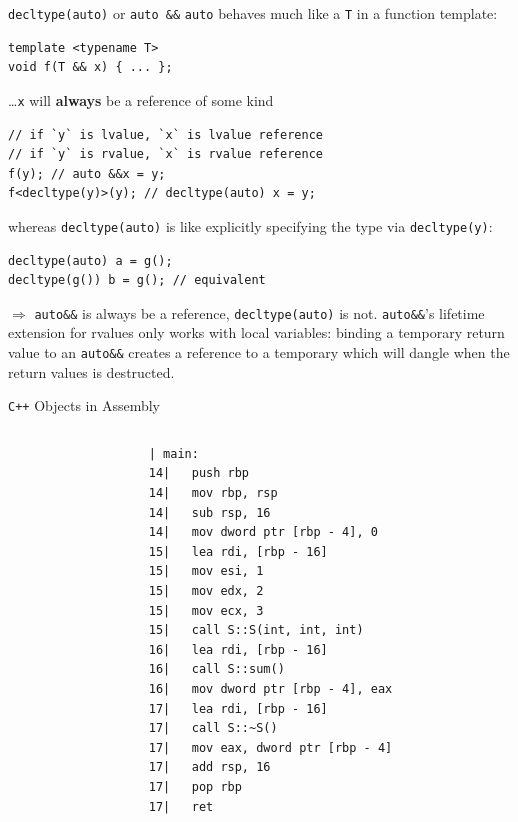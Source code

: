\documentclass[compress,aspectratio=1610]{beamer}
\newcommand{\inputcpplisting}[1]{}
\begin{document}
\begin{frame}[fragile]{\texttt{decltype(auto)} or \texttt{auto \&\&}}
    \texttt{auto} behaves much like a \texttt{T} in a function template:
    \begin{lstlisting}
template <typename T>
void f(T && x) { ... };
    \end{lstlisting}
    \ldots \texttt{x} will \textbf{always} be a reference of some kind
    \begin{lstlisting}
// if `y` is lvalue, `x` is lvalue reference
// if `y` is rvalue, `x` is rvalue reference
f(y); // auto &&x = y;
f<decltype(y)>(y); // decltype(auto) x = y;
    \end{lstlisting}
    whereas \texttt{decltype(auto)} is like explicitly specifying the type via \texttt{decltype(y)}:
    \begin{lstlisting}
decltype(auto) a = g();
decltype(g()) b = g(); // equivalent
    \end{lstlisting}

    $\Rightarrow$ \texttt{auto\&\&} is always be a reference, \texttt{decltype(auto)} is not. \texttt{auto\&\&}'s lifetime extension for rvalues only works with local variables: binding a temporary return value to an \texttt{auto\&\&} creates a reference to a temporary which will dangle when the return values is destructed. 
\end{frame}

\begin{frame}[fragile]{\texttt{C++} Objects in Assembly}
    \begin{columns}[t]
        \begin{column}{.45\textwidth}
            \inputcpplisting{snippet20}
        \end{column}
        \begin{column}{.45\textwidth}
            \begin{lstlisting}[language={},morekeywords={rdi},numbers=none]
  | main:
14|   push rbp
14|   mov rbp, rsp
14|   sub rsp, 16
14|   mov dword ptr [rbp - 4], 0
15|   lea rdi, [rbp - 16]
15|   mov esi, 1
15|   mov edx, 2
15|   mov ecx, 3
15|   call S::S(int, int, int)
16|   lea rdi, [rbp - 16]
16|   call S::sum()
16|   mov dword ptr [rbp - 4], eax
17|   lea rdi, [rbp - 16]
17|   call S::~S()
17|   mov eax, dword ptr [rbp - 4]
17|   add rsp, 16
17|   pop rbp
17|   ret
            \end{lstlisting}
        \end{column}
    \end{columns}
\end{frame}
\end{document}
